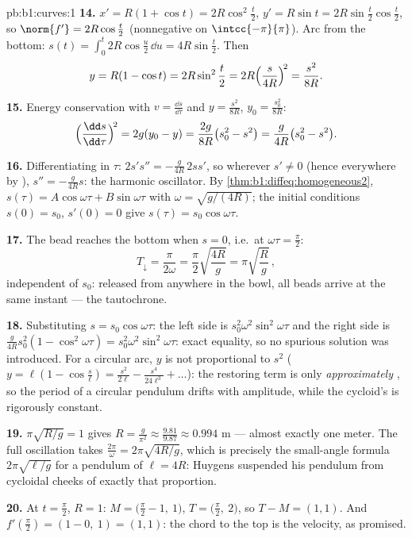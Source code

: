\begin{solution}{pb:b1:curves:1}
\textbf{14.} $x' = R(1 + \cos t) = 2R\cos^2\frac t2$, $y' =
R\sin t = 2R\sin\frac t2\cos\frac t2$, so $\norm{f'} =
2R\cos\frac t2$ (nonnegative on $\intcc{-\pi}{\pi}$). Arc from
the bottom: $s(t) = \int_0^t 2R\cos\frac u2\,\dd u =
4R\sin\frac t2$. Then
\[
y = R(1 - \cos t) = 2R\sin^2\frac t2
= 2R\Bigl(\frac{s}{4R}\Bigr)^{\!2} = \frac{s^2}{8R} .
\]

\textbf{15.} Energy conservation with $v = \frac{\dd s}{\dd\tau}$
and $y = \frac{s^2}{8R}$, $y_0 = \frac{s_0^2}{8R}$:
\[
\Bigl(\frac{\dd s}{\dd\tau}\Bigr)^{\!2} = 2g(y_0 - y)
= \frac{2g}{8R}\bigl(s_0^2 - s^2\bigr)
= \frac{g}{4R}\bigl(s_0^2 - s^2\bigr).
\]

\textbf{16.} Differentiating in $\tau$: $2s's'' =
-\frac{g}{4R}\,2ss'$, so wherever $s' \neq 0$ (hence everywhere
by ), $s'' = -\frac{g}{4R}s$: the harmonic oscillator.
By \cref{thm:b1:diffeq:homogeneous2}, $s(\tau) =
A\cos\omega\tau + B\sin\omega\tau$ with $\omega =
\sqrt{g/(4R)}$; the initial conditions $s(0) = s_0$, $s'(0) = 0$
give $s(\tau) = s_0\cos\omega\tau$.

\textbf{17.} The bead reaches the bottom when $s = 0$, i.e.\ at
$\omega\tau = \frac\pi2$:
\[
T_{\downarrow} = \frac{\pi}{2\omega}
= \frac\pi2\sqrt{\frac{4R}{g}} = \pi\sqrt{\frac Rg}\,,
\]
independent of $s_0$: released from anywhere in the bowl, all
beads arrive at the same instant --- the tautochrone.

\textbf{18.} Substituting $s = s_0\cos\omega\tau$: the left side
is $s_0^2\omega^2\sin^2\omega\tau$ and the right side is
$\frac{g}{4R}s_0^2(1 - \cos^2\omega\tau) =
s_0^2\omega^2\sin^2\omega\tau$: exact equality, so no spurious
solution was introduced. For a circular arc, $y$ is not
proportional to $s^2$ ($y = \ell(1 - \cos\frac s\ell) =
\frac{s^2}{2\ell} - \frac{s^4}{24\ell^3} + \dots$): the
restoring term is only \emph{approximately} , so the
period of a circular pendulum drifts with amplitude, while the
cycloid's is rigorously constant.

\textbf{19.} $\pi\sqrt{R/g} = 1$ gives $R = \frac{g}{\pi^2}
\approx \frac{9.81}{9.87} \approx 0.994$ m --- almost exactly
one meter. The full oscillation takes $\frac{2\pi}\omega =
2\pi\sqrt{4R/g}$, which is precisely the small-angle formula
$2\pi\sqrt{\ell/g}$ for a pendulum of  $\ell = 4R$:
Huygens suspended his pendulum from cycloidal cheeks of exactly
that proportion.

\textbf{20.} At $t = \frac\pi2$, $R = 1$: $M = \bigl(\frac\pi2 -
1,\ 1\bigr)$, $T = \bigl(\frac\pi2,\ 2\bigr)$, so $T - M = (1,
1)$. And $f'(\frac\pi2) = (1 - 0,\ 1) = (1, 1)$: the chord to
the top is the velocity, as promised.


\end{solution}
